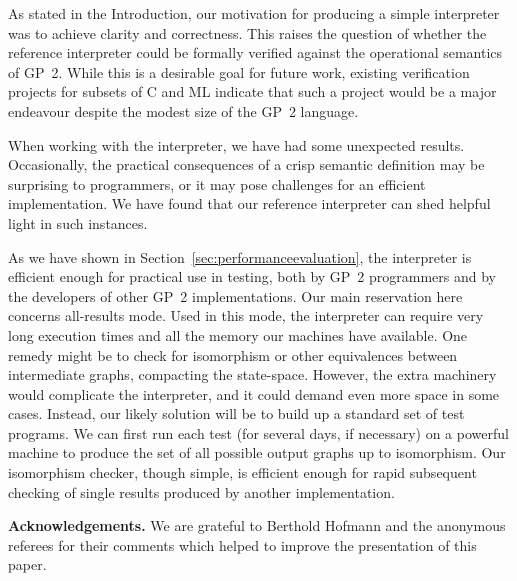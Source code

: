 As stated in the Introduction, our motivation for producing a simple interpreter was to achieve clarity and correctness. This raises the question of whether the reference interpreter could be formally verified against the operational semantics of GP~2. While this is a desirable goal for future work, existing verification projects for subsets of C \cite{Leroy09a} and ML \cite{Kumar-Myreen-Norrish-Owens14a} indicate that such a project would be a major endeavour despite the modest size of the GP~2 language.

When working with the interpreter, we have had some unexpected results. Occasionally, the practical consequences of a crisp semantic definition may be surprising to programmers, or it may pose challenges for an efficient implementation. We have found that our reference interpreter can shed helpful light in such instances.

As we have shown in Section~\ref{sec:performanceevaluation}, the interpreter is efficient enough for practical use in testing,
both by GP~2 programmers and by the developers of other GP~2 implementations.
Our main reservation here concerns all-results mode.
Used in this mode, the interpreter can require very long execution times and all the memory our machines have available.
One remedy might be to check for isomorphism or other equivalences
between intermediate graphs, compacting the state-space.
However, the extra machinery would complicate the interpreter, and it
could demand even more space in some cases.
Instead, our likely solution will be to build up a standard set of test programs.
We can first run each test (for several days, if necessary)
on a powerful machine to produce the set of all possible output graphs up to isomorphism.
Our isomorphism checker, though simple, is efficient enough for rapid
subsequent checking of single results produced by another implementation.

\vspace{\baselineskip}
\noindent\textbf{Acknowledgements.} We are grateful to Berthold Hofmann and the anonymous referees for their comments which helped to improve the presentation of this paper.